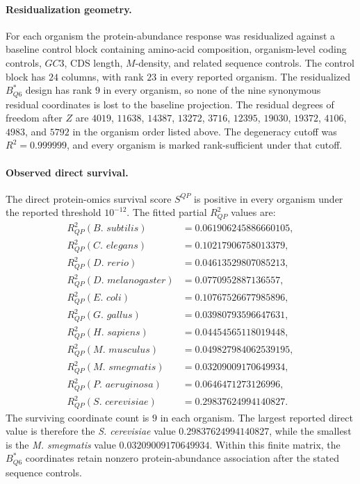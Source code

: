\paragraph{Residualization geometry.}
For each organism the protein-abundance response was residualized against a baseline control block containing amino-acid composition, organism-level coding controls, $GC3$, CDS length, $M$-density, and related sequence controls.  The control block has $24$ columns, with rank $23$ in every reported organism.  The residualized $B^{*}_{Q6}$ design has rank $9$ in every organism, so none of the nine synonymous residual coordinates is lost to the baseline projection.  The residual degrees of freedom after $Z$ are $4019$, $11638$, $14387$, $13272$, $3716$, $12395$, $19030$, $19372$, $4106$, $4983$, and $5792$ in the organism order listed above.  The degeneracy cutoff was $R^2=0.999999$, and every organism is marked rank-sufficient under that cutoff.

\paragraph{Observed direct survival.}
The direct protein-omics survival score $S^{QP}$ is positive in every organism under the reported threshold $10^{-12}$.  The fitted partial $R^2_{QP}$ values are:
$$
\begin{aligned}
R^2_{QP}(\textit{B. subtilis}) &= 0.061906245886660105,\\
R^2_{QP}(\textit{C. elegans}) &= 0.10217906758013379,\\
R^2_{QP}(\textit{D. rerio}) &= 0.04613529807085213,\\
R^2_{QP}(\textit{D. melanogaster}) &= 0.0770952887136557,\\
R^2_{QP}(\textit{E. coli}) &= 0.10767526677985896,\\
R^2_{QP}(\textit{G. gallus}) &= 0.03980793596647631,\\
R^2_{QP}(\textit{H. sapiens}) &= 0.04454565118019448,\\
R^2_{QP}(\textit{M. musculus}) &= 0.049827984062539195,\\
R^2_{QP}(\textit{M. smegmatis}) &= 0.03209009170649934,\\
R^2_{QP}(\textit{P. aeruginosa}) &= 0.0646471273126996,\\
R^2_{QP}(\textit{S. cerevisiae}) &= 0.29837624994140827.
\end{aligned}
$$
The surviving coordinate count is $9$ in each organism.  The largest reported direct value is therefore the \textit{S. cerevisiae} value $0.29837624994140827$, while the smallest is the \textit{M. smegmatis} value $0.03209009170649934$.  Within this finite matrix, the $B^{*}_{Q6}$ coordinates retain nonzero protein-abundance association after the stated sequence controls.

